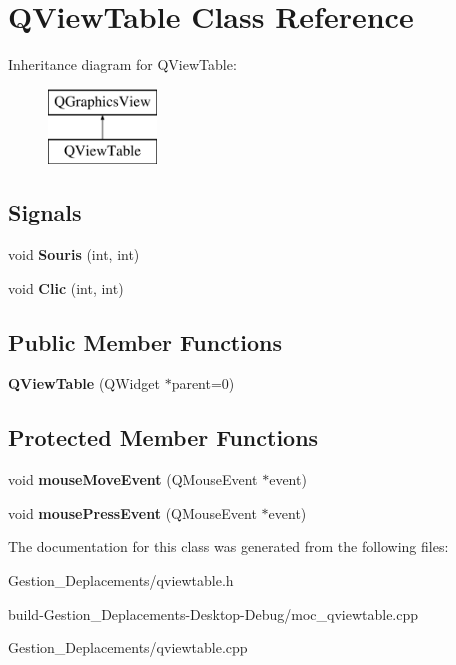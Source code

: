 \section{Q\-View\-Table Class Reference}
\label{class_q_view_table}
Inheritance diagram for Q\-View\-Table\-:\begin{figure}[H]
\begin{center}
\leavevmode
\includegraphics[height=2.000000cm]{class_q_view_table}
\end{center}
\end{figure}
\subsection*{Signals}
\begin{DoxyCompactItemize}
\item 
void {\bfseries Souris} (int, int)\label{class_q_view_table_aeed427b455f8922fb7809a9c9dcd583a}

\item 
void {\bfseries Clic} (int, int)\label{class_q_view_table_a789d3d7b06c4619f7df2b452d8f75a27}

\end{DoxyCompactItemize}
\subsection*{Public Member Functions}
\begin{DoxyCompactItemize}
\item 
{\bfseries Q\-View\-Table} (Q\-Widget $\ast$parent=0)\label{class_q_view_table_a7eb9f241410b3a84f22f86c7938cefa5}

\end{DoxyCompactItemize}
\subsection*{Protected Member Functions}
\begin{DoxyCompactItemize}
\item 
void {\bfseries mouse\-Move\-Event} (Q\-Mouse\-Event $\ast$event)\label{class_q_view_table_a5cfb236893278305f1e301deb263cceb}

\item 
void {\bfseries mouse\-Press\-Event} (Q\-Mouse\-Event $\ast$event)\label{class_q_view_table_a97a479e58095cecd7c929aece94024e3}

\end{DoxyCompactItemize}


The documentation for this class was generated from the following files\-:\begin{DoxyCompactItemize}
\item 
Gestion\-\_\-\-Deplacements/qviewtable.\-h\item 
build-\/\-Gestion\-\_\-\-Deplacements-\/\-Desktop-\/\-Debug/moc\-\_\-qviewtable.\-cpp\item 
Gestion\-\_\-\-Deplacements/qviewtable.\-cpp\end{DoxyCompactItemize}
